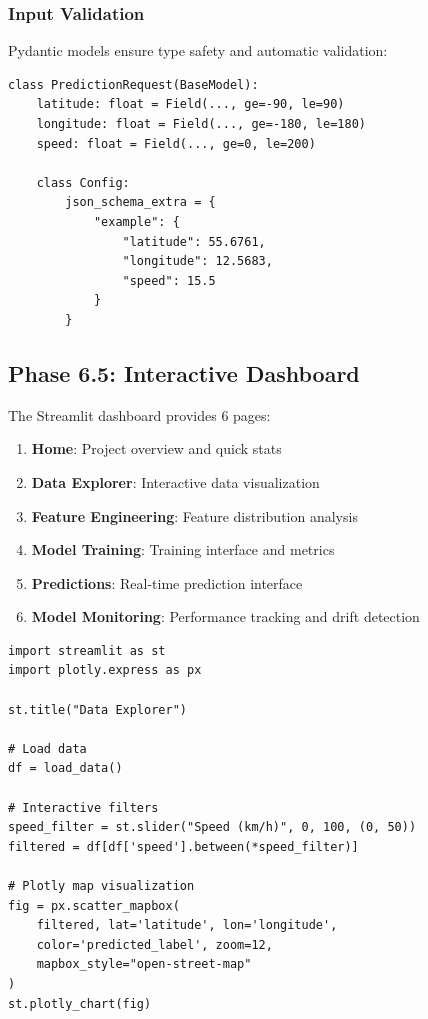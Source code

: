 \subsubsection{Input Validation}

Pydantic models ensure type safety and automatic validation:

\begin{lstlisting}[style=python, caption=Pydantic Validation]
class PredictionRequest(BaseModel):
    latitude: float = Field(..., ge=-90, le=90)
    longitude: float = Field(..., ge=-180, le=180)
    speed: float = Field(..., ge=0, le=200)
    
    class Config:
        json_schema_extra = {
            "example": {
                "latitude": 55.6761,
                "longitude": 12.5683,
                "speed": 15.5
            }
        }
\end{lstlisting}

\subsection{Phase 6.5: Interactive Dashboard}

The Streamlit dashboard provides 6 pages:

\begin{enumerate}
    \item \textbf{Home}: Project overview and quick stats
    \item \textbf{Data Explorer}: Interactive data visualization
    \item \textbf{Feature Engineering}: Feature distribution analysis
    \item \textbf{Model Training}: Training interface and metrics
    \item \textbf{Predictions}: Real-time prediction interface
    \item \textbf{Model Monitoring}: Performance tracking and drift detection
\end{enumerate}

\begin{lstlisting}[style=python, caption=Dashboard Page Example]
import streamlit as st
import plotly.express as px

st.title("Data Explorer")

# Load data
df = load_data()

# Interactive filters
speed_filter = st.slider("Speed (km/h)", 0, 100, (0, 50))
filtered = df[df['speed'].between(*speed_filter)]

# Plotly map visualization
fig = px.scatter_mapbox(
    filtered, lat='latitude', lon='longitude',
    color='predicted_label', zoom=12,
    mapbox_style="open-street-map"
)
st.plotly_chart(fig)
\end{lstlisting}

